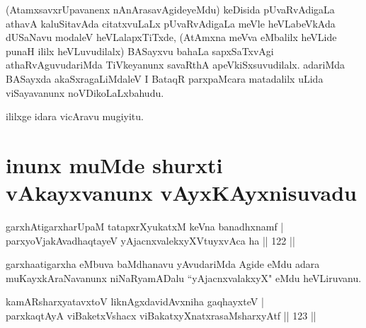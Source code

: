 \begin{artha}
(AtamxsavxrUpavanenx nAnArasavAgideyeMdu) keDisida pUvaRvAdigaLa athavA kaluSitavAda citatxvuLaLx pUvaRvAdigaLa meVle heVLabeVkAda dUSaNavu modaleV heVLalapxTiTxde, (AtAmxna meVva eMbalilx heVLide punaH ililx heVLuvudilalx) BASayxvu bahaLa sapxSaTxvAgi athaRvAguvudariMda TiVkeyanunx savaRthA apeVkiSxsuvudilalx. adariMda BASayxda akaSxragaLiMdaleV I BataqR parxpaMcara matadalilx uLida viSayavanunx noVDikoLaLxbahudu.
\end{artha}
	
\begin{center}
ililxge idara vicAravu mugiyitu.
\end{center}

\section*{inunx muMde shurxti vAkayxvanunx vAyxKAyxnisuvadu}


\begin{shl}
garxhAtigarxharUpaM tatapxrXyukatxM keVna banadhxnamf |\\
parxyoVjakAvadhaqtayeV yAjacnxvalekxyXVtuyxvAca ha \hfill || 122 ||
\end{shl}

\begin{artha}
garxhaatigarxha eMbuva baMdhanavu yAvudariMda Agide eMdu adara muKayxkAraNavanunx niNaRyamADalu ``yAjacnxvalakxyX" eMdu heVLiruvanu.
\end{artha}



\begin{shl}
kamARsharxyatavxtoV liknAgxdavidAvxniha gaqhayxteV |\\
parxkaqtAyA viBaketxVshacx viBakatxyXnatxrasaMsharxyAtf \hfill || 123 ||
\end{shl}

